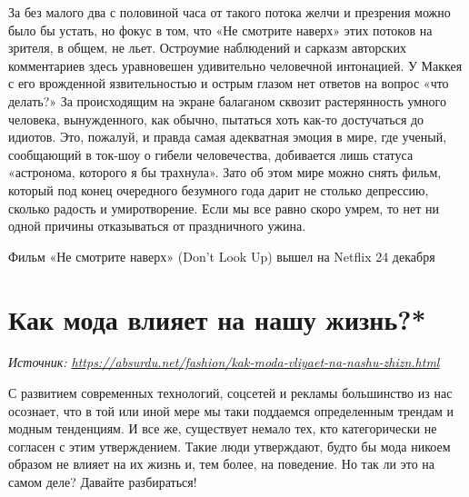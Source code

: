 За без малого два с половиной часа от такого потока желчи и презрения можно было бы устать, но фокус в том, что «Не смотрите наверх» этих потоков на зрителя, в общем, не льет. Остроумие наблюдений и сарказм авторских комментариев здесь уравновешен удивительно человечной интонацией. У Маккея с его врожденной язвительностью и острым глазом нет ответов на вопрос «что делать?» За происходящим на экране балаганом сквозит растерянность умного человека, вынужденного, как обычно, пытаться хоть как-то достучаться до идиотов. Это, пожалуй, и правда самая адекватная эмоция в мире, где ученый, сообщающий в ток-шоу о гибели человечества, добивается лишь статуса «астронома, которого я бы трахнула». Зато об этом мире можно снять фильм, который под конец очередного безумного года дарит не столько депрессию, сколько радость и умиротворение. Если мы все равно скоро умрем, то нет ни одной причины отказываться от праздничного ужина.

Фильм «Не смотрите наверх» (Don't Look Up) вышел на Netflix 24 декабря

\clearpage


\section{Как мода влияет на нашу жизнь?*}

\textit{Источник: \url{https://absurdu.net/fashion/kak-moda-vliyaet-na-nashu-zhizn.html}}

С развитием современных технологий, соцсетей и рекламы большинство из нас осознает, что в той или иной мере мы таки поддаемся определенным трендам и модным тенденциям. И все же, существует немало тех, кто категорически не согласен с этим утверждением. Такие люди утверждают, будто бы мода никоем образом не влияет на их жизнь и, тем более, на поведение. Но так ли это на самом деле? Давайте разбираться!


